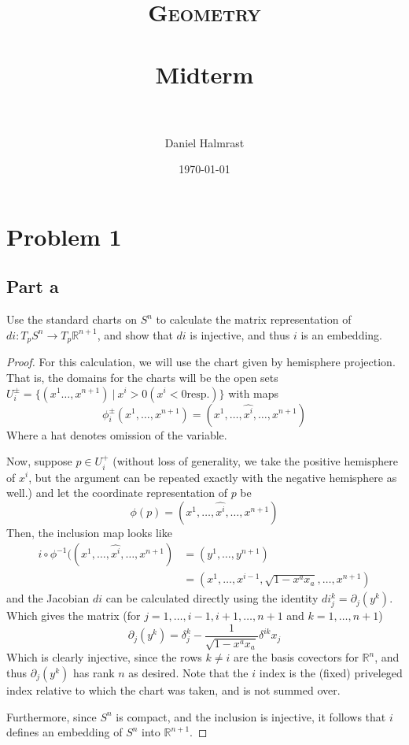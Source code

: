 \documentclass[fontsize=11pt]{scrartcl} %
\title{	
\normalfont \normalsize 
\textsc{Geometry} \\ [25pt] %
\horrule{0.5pt} \\[0.4cm] %
\huge Midterm\\ %
\horrule{2pt} \\[0.5cm] %
}
\author{Daniel Halmrast} %
\date{\normalsize\today} %
\numberwithin{equation}{section} %
\numberwithin{figure}{section} %
\numberwithin{table}{section} %
\newcommand{\R}{\mathbb{R}}
\begin{document}
\maketitle %

\section*{Problem 1}
\subsection*{Part a}
Use the standard charts on $S^n$ to calculate the matrix representation of $di:T_pS^n\to T_p\R^{n+1}$,
and show that $di$ is injective, and thus $i$ is an embedding.
\\
\begin{proof}
For this calculation, we will use the chart given by hemisphere projection. That is, the
domains for the charts will be the open sets $U_i^{\pm}=\{(x^1\ldots,x^{n+1})\ |\ x^i>0 (x^i<0\textrm{resp.})\}$
with maps
\[
\phi_i^{\pm}(x^1,\ldots,x^{n+1}) = (x^1,\ldots,\hat{x^i},\ldots,x^{n+1})
\]
Where a hat denotes omission of the variable.

Now, suppose $p\in U_i^+$ (without loss of generality, we take the positive hemisphere
of $x^i$, but the argument can be repeated exactly with the negative hemisphere as well.)
and let the coordinate representation of $p$ be
\[
\phi(p) = (x^1,\ldots,\hat{x^i},\ldots,x^{n+1})
\]
Then, the inclusion map looks like
\[
\begin{aligned}
i\circ\phi^{-1}((x^1,\ldots,\hat{x^i},\ldots,x^{n+1}) &=(y^1,\ldots,y^{n+1})\\
                        &=(x^1,\ldots,x^{i-1},\sqrt{1-x^ax_a},\ldots,x^{n+1})
\end{aligned}
\]
and the Jacobian $di$ can be calculated directly using the identity $di_j^k=\partial_j(y^k)$.
Which gives the matrix (for $j=1,\ldots,i-1,i+1,\ldots,n+1$ and $k=1,\ldots,n+1$)
\[
\partial_j(y^k) = \delta_j^k -\frac{1}{\sqrt{1-x^ax_a}}\delta^{ik} x_j
\]
Which is clearly injective, since the rows $k\neq i$ are the basis covectors for $\R^n$, and
thus $\partial_j(y^k)$ has rank $n$ as desired.
Note that the $i$ index is the (fixed) priveleged index relative to which the chart was taken,
and is not summed over.

Furthermore, since $S^n$ is compact, and the inclusion is injective, it follows that
$i$ defines an embedding of $S^n$ into $\R^{n+1}$.
\end{proof}
\end{document}
